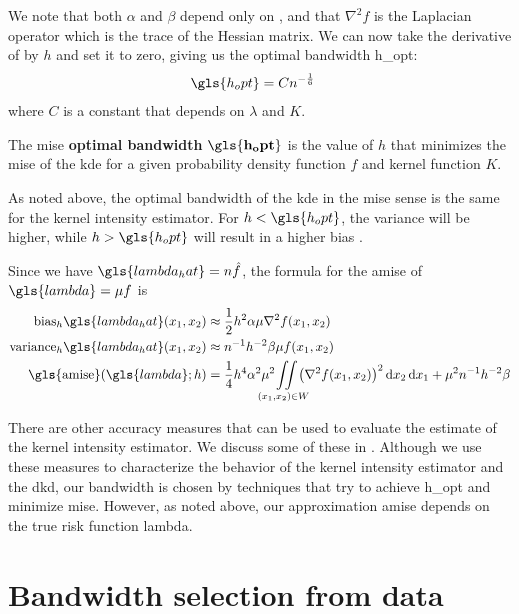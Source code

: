 We note that both $\alpha$ and $\beta$ depend only on \Kdots,
and that $\nabla^2 f$ is the Laplacian operator which is the trace of the Hessian matrix.
We can now take the derivative of  by $h$ and set it to zero,
giving us the optimal bandwidth \gls{h_opt}:
\begin{align}
    \gls{h_opt} & = C n^{-\frac{1}{6}}
\end{align}
where $C$ is a constant that depends on $\lambda$ and $K$.
\begin{defn}
    The \gls{mise} \textbf{optimal bandwidth} $\mathbf{\gls{h_opt}}$ is the value of $h$ that minimizes the \gls{mise} of the \gls{kde} for a given probability density function $f$ and kernel function $K$.
\end{defn}
As noted above,
the optimal bandwidth of the \gls{kde} in the \gls{mise} sense is the same for the \gls{kernel intensity estimator}.
For $h < \gls{h_opt}$, the variance will be higher, while $h > \gls{h_opt}$ will result in a higher bias .

Since we have $\gls{lambda_hat} = n \hat{f}$,
the formula for the \gls{amise} of $\gls{lambda} = \mu f$ is
\begin{align}
    \mbox{bias}_h \gls{lambda_hat} \xvec%
        & \approx \frac{1}{2} h^{2} \alpha \mu \nabla^2 f \xvec \nonumber \\%
    \mbox{variance}_h  \gls{lambda_hat} \xvec%
        & \approx n^{-1} h^{-2} \beta \mu f \xvec \nonumber \\%
    \mbox{\gls{amise}}(\gls{lambda}; h)%
        & = \frac{1}{4} h^{4} \alpha^2 \mu^2 \iintW{\left( \nabla^2 f \xvec \right)^2 }%
            + \mu^2 n^{-1} h^{-2} \beta \label{eq:amiselambda}%
\end{align}

There are other accuracy measures that can be used to evaluate the estimate of the \gls{kernel intensity estimator}.
We discuss some of these in .
Although we use these measures to characterize the behavior of the \gls{kernel intensity estimator} and the \gls{dkd},
our bandwidth is chosen by techniques that try to achieve \gls{h_opt} and minimize \gls{mise}.
However, as noted above,
our approximation \gls{amise} depends on the true risk function \gls{lambda}.


\section{Bandwidth selection from data}
\label{sec:theory:bandwidthselection}


